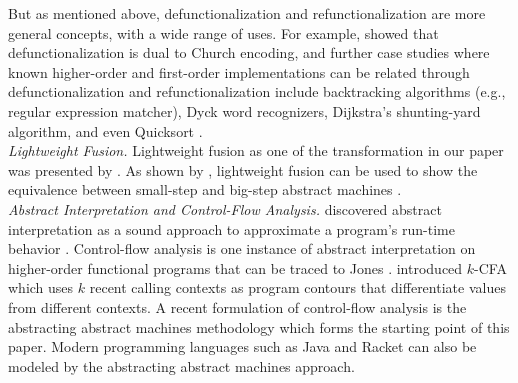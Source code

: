 \documentclass[acmsmall, review]{acmart}\settopmatter{}
\begin{document}
But as mentioned above, defunctionalization and refunctionalization are more general concepts, 
with a wide range of uses. For example, \citet{Danvy:2001:DW:773184.773202} showed that 
defunctionalization is dual to Church encoding, and further case studies where known
higher-order and first-order implementations can be related through defunctionalization
and refunctionalization include backtracking algorithms (e.g., regular expression matcher), 
Dyck word recognizers, Dijkstra's shunting-yard algorithm, and even Quicksort 
\cite{Danvy:2006:RW:2171265.2171268, DANVY2009534, Danvy:2001:DW:773184.773202}. \\


\textit{Lightweight Fusion.}
Lightweight fusion as one of the transformation in our paper was presented by 
\citeauthor{Ohori:2007:LFF:1190216.1190241} \cite{Ohori:2007:LFF:1190216.1190241}.
As shown by \citeauthor{DANVY2008100}, lightweight fusion can be used to show the 
equivalence between small-step and big-step abstract machines \cite{DANVY2008100}.\\

\textit{Abstract Interpretation and Control-Flow Analysis.}
\citeauthor{cousot1977abstract} discovered abstract interpretation as a sound approach to
approximate a program's run-time behavior \cite{cousot1977abstract}. Control-flow analysis
is one instance of abstract interpretation on higher-order functional programs that can be traced to
Jones \cite{jones1981flow}.  
introduced $k$-CFA which uses $k$ recent calling contexts as program contours that 
differentiate values from different contexts.
A recent formulation of control-flow analysis is the abstracting abstract machines
methodology \cite{van2012systematic, van2010abstracting} which forms the starting point
of this paper. Modern programming languages such as Java \cite{might2010resolving} and
Racket \cite{Tobin-Hochstadt:2012:HSE:2384616.2384655} can also be modeled by the abstracting
abstract machines approach. \\
\end{document}
